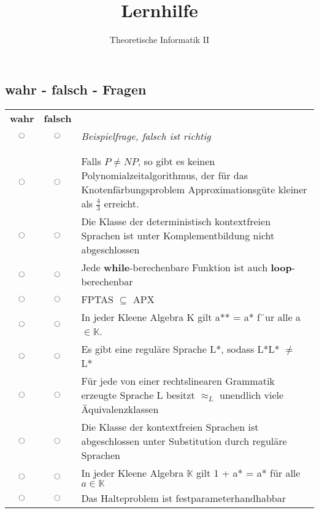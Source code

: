 \documentclass[a4paper,12pt]{article}
\author{Theoretische Informatik II}
\title{ \textbf{Lernhilfe}}
\newcommand{\radio}{\ooalign{\hidewidth$\bullet$\hidewidth\cr$\ocircle$}}
\begin{document}
	 
	\maketitle	 %
	
	\subsection{wahr - falsch - Fragen}
	\begin{tabular}{ccp{}}
		\textbf{wahr} & \textbf{falsch} & ~ \\
		$\ocircle$ & \ifanswers \radio \else $\ocircle$ \fi & \textit{Beispielfrage, falsch ist richtig} \\
		\ifanswers \multicolumn{3}{l}{\textcolor{red}{Begr\"undung der Antwort}} \\ \fi \\
		$\ocircle$ & $\ocircle$ & Falls $P \not= NP$, so gibt es keinen Polynomialzeitalgorithmus, der f\"ur das Knotenf\"arbungsproblem	Approximationsg\"ute kleiner als $\frac{4}{3}$ erreicht.\\
		$\ocircle$ & $\ocircle$ & Die Klasse der deterministisch kontextfreien Sprachen ist unter Komplementbildung nicht abgeschlossen\\
		$\ocircle$ & $\ocircle$ & Jede \textbf{while}-berechenbare Funktion ist auch \textbf{loop}-berechenbar\\
		$\ocircle$ & $\ocircle$ & FPTAS $\subseteq$ APX\\
		$\ocircle$ & $\ocircle$ & In jeder Kleene Algebra K gilt a** = a* f¨ur alle a $\in \mathds{K}$.\\
		$\ocircle$ & $\ocircle$ & Es gibt eine regul\"are Sprache L*, sodass L*L* $\not= $ L* \\
		$\ocircle$ & $\ocircle$ & F\"ur jede von einer rechtslinearen Grammatik erzeugte Sprache L besitzt $\approx_L$ unendlich viele \"Aquivalenzklassen\\
		$\ocircle$ & $\ocircle$ & Die Klasse der kontextfreien Sprachen ist abgeschlossen unter Substitution durch regul\"are Sprachen\\
		$\ocircle$ & $\ocircle$ & In jeder Kleene Algebra $\mathds{K}$ gilt 1 + a* = a* f\"ur alle $a \in \mathds{K}$\\
		$\ocircle$ & $\ocircle$ & Das Halteproblem ist festparameterhandhabbar\\

\end{tabular}
\end{document}
